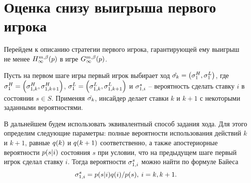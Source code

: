 {\section{Оценка снизу выигрыша первого игрока}\label{ch1:lower-bound}
Перейдем к описанию стратегии первого игрока, гарантирующей ему выигрыш не менее $\H*{\infty}(p)$ в игре $\theG*{\infty}(p)$.

Пусть на первом шаге игры первый игрок выбирает ход %
$\sigmak = \left(\sigmas[H]{1}, \sigmas[L]{1}\right)$, где %
$\sigmas[H]{1} = \left(\sigmasc[H]{k}, \sigmasc[H]{k+1}\right)$,
$\sigmas[L]{1} = \left(\sigmasc[L]{k}, \sigmasc[L]{k+1}\right)$ и
$\sigmasc[s]{i}$ -- вероятность сделать ставку $i$ в состоянии $s \in S$.
Применяя $\hat{\sigma_k}$, инсайдер делает ставки $k$ и $k+1$ с некоторыми заданными вероятностями.

В дальнейшем будем использовать эквивалентный способ задания хода.
Для этого определим следующие параметры: полные вероятности использования действий $k$ и $k+1$, равные $q(k)$ и $q(k+1)$ соответственно, а также апостериорные вероятности $p(s|i)$ состояния $s$ при условии, что на предыдущем шаге первый игрок сделал ставку $i$.
Тогда вероятности $\sigmasc[s]{i}$ можно найти по формуле Байеса
\[
  \sigmasc[s]{i} = \pac{s}{i} \qc{i} / \pc{s}, \: i = k, k + 1.
\]

}
